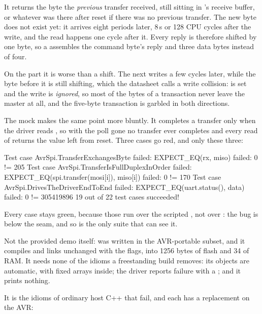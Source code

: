  It returns the byte the \emph{previous} transfer received, still sitting in 's
receive buffer, or whatever was there after reset if there was no previous transfer. The new byte
does not exist yet: it arrives eight  periods later, 8\,\textmu s or 128 CPU cycles after
the write, and the read happens one cycle after it. Every reply is therefore shifted by one byte,
so a  assembles the command byte's reply and three data bytes instead of four.

On the part it is worse than a shift. The next  writes  a few cycles
later, while the byte before it is still shifting, which the datasheet calls a write collision:
 is set and the write is \emph{ignored}, so most of the bytes of a transaction never
leave the master at all, and the five-byte transaction is garbled in both directions.

The mock makes the same point more bluntly. It completes a transfer only when the driver reads
, so with the poll gone no transfer ever completes and every read of  returns
the value left from reset. Three cases go red, and only these three:

\begin{console}
Test case AvrSpi.TransferExchangesByte failed: EXPECT_EQ(rx, miso) failed: 0 != 205
Test case AvrSpi.TransferIsFullDuplexInOrder failed: EXPECT_EQ(spi.transfer(mosi[i]), miso[i])
  failed: 0 != 170
Test case AvrSpi.DrivesTheDriverEndToEnd failed: EXPECT_EQ(uart.status(), data) failed:
  0 != 305419896
19 out of 22 test cases succeeded!
\end{console}

\noindent Every  case stays green, because those run over the scripted
, not over : the bug is below the seam, and so is the only suite
that can see it.

 Not the provided demo itself:  was written in the AVR-portable
subset, and it compiles and links unchanged with the  flags, into 1256 bytes of flash
and 34 of RAM. It needs none of the idioms a freestanding build removes: its objects are automatic,
with fixed arrays inside; the driver reports failure with a ; and it prints nothing.

It is the idioms of ordinary host C++ that fail, and each has a replacement on the AVR:

